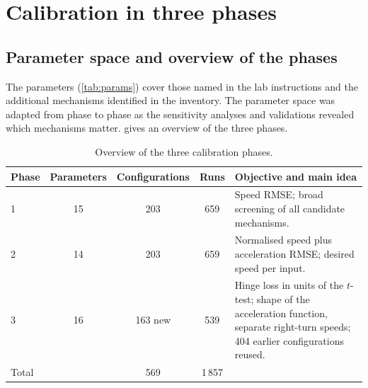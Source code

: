 \documentclass[11pt,a4paper]{article}
\begin{document}
\section{Calibration in three phases}
\label{sec:calibration}

\subsection{Parameter space and overview of the phases}

The parameters (\cref{tab:params}) cover those named in the lab instructions and the additional
mechanisms identified in the inventory. The parameter space was adapted from phase to phase as the
sensitivity analyses and validations revealed which mechanisms matter.  gives an
overview of the three phases.

\begin{table}[!htb]
\centering
\caption[Overview of the three calibration phases]{Overview of the three calibration phases.}
\label{tab:phases}
\small
\begin{tabularx}{\textwidth}{lcccX}
\toprule
\textbf{Phase} & \textbf{Parameters} & \textbf{Configurations} & \textbf{Runs} & \textbf{Objective and main idea}\\
\midrule
1 & 15 & 203     & 659 & Speed RMSE; broad screening of all candidate mechanisms.\\
2 & 14 & 203     & 659 & Normalised speed plus acceleration RMSE; desired speed per input.\\
3 & 16 & 163 new & 539 & Hinge loss in units of the $t$-test; shape of the acceleration function,
                          separate right-turn speeds; 404 earlier configurations reused.\\
\midrule
Total & & 569 & 1\,857 & \\
\bottomrule
\end{tabularx}
\end{table}
\end{document}
